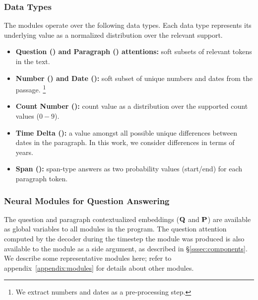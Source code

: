 \documentclass[main.tex]{subfiles}
\begin{document}
\subsubsection{Data Types}
\label{sssec:datatypes}
The modules operate over the following data types. Each data type represents its underlying value as a normalized distribution over the relevant support.
\begin{itemize}[nosep]
    \item
\textbf{Question (\typeQues) and Paragraph (\typePara) attentions:} soft subsets of relevant tokens in the text.

    \item
\textbf{Number (\typeNum) and Date (\typeDate):} soft subset of unique numbers and dates from the passage.
\footnote{We extract numbers and dates as a pre-processing step.}

    \item
\textbf{Count Number (\typeCount):} count value as a distribution over the supported count values ($0-9$).

    \item
\textbf{Time Delta (\typeTD):} a value amongst all possible unique differences between dates in the paragraph.
In this work, we consider differences in terms of years.

    \item
\textbf{Span (\typeSpan):} span-type answers as two probability values (start/end) for each paragraph token.
\end{itemize}



\subsubsection{Neural Modules for Question Answering}
\label{sssec:neuralmodules}
The question and paragraph contextualized embeddings ($\mathbf{Q}$ and $\mathbf{P}$) are available as global variables to all modules in the program. The question attention computed by the decoder during the timestep the module was produced is also available to the module as a side argument, as described in \S\ref{sssec:components}. We describe some representative modules here; refer to appendix~\ref{appendix:modules} for details about other modules.
\end{document}
